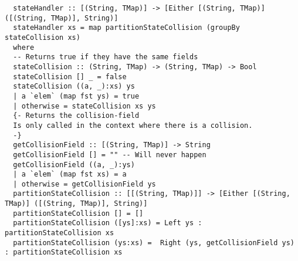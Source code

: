 \begin{verbatim}
  stateHandler :: [(String, TMap)] -> [Either [(String, TMap)] ([(String, TMap)], String)]
  stateHandler xs = map partitionStateCollision (groupBy stateCollision xs)
  where
  -- Returns true if they have the same fields
  stateCollision :: (String, TMap) -> (String, TMap) -> Bool
  stateCollision [] _ = false
  stateCollision ((a, _):xs) ys
  | a `elem` (map fst ys) = true
  | otherwise = stateCollision xs ys
  {- Returns the collision-field
  Is only called in the context where there is a collision.
  -}
  getCollisionField :: [(String, TMap)] -> String
  getCollisionField [] = "" -- Will never happen
  getCollisionField ((a, _):ys)
  | a `elem` (map fst xs) = a
  | otherwise = getCollisionField ys
  partitionStateCollision :: [[(String, TMap)]] -> [Either [(String, TMap)] ([(String, TMap)], String)]
  partitionStateCollision [] = []
  partitionStateCollision ([ys]:xs) = Left ys : partitionStateCollision xs
  partitionStateCollision (ys:xs) =  Right (ys, getCollisionField ys) : partitionStateCollision xs
\end{verbatim}
